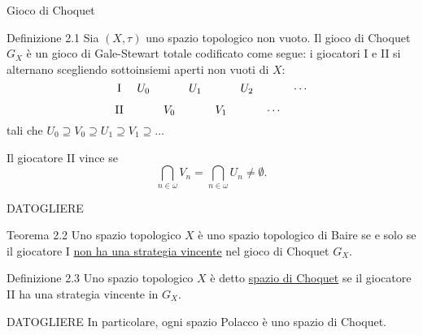 \documentclass[babel]{beamer}
\renewcommand{\href}[2]{#2}
\begin{document}
\begin{frame}[label={sec:org1e115ec}]{Gioco di Choquet}
\begin{block}{Definizione 2.1}
Sia \((X,\tau)\) uno \href{../../../../../../../org/roam/20250103145124-topologia.org}{spazio topologico} non vuoto. Il gioco di Choquet \(G_{X}\) è un \href{../../../../../../../org/roam/20250513155732-logic_game.org}{gioco} \href{../../../../../../../org/roam/20250513171520-giochi_di_gale_stewart.org}{di Gale-Stewart} totale codificato come segue: i giocatori I e II si alternano scegliendo sottoinsiemi aperti non vuoti di \(X\):
\begin{equation*}
\begin{tikzcd}[ampersand replacement=\&,cramped,sep=tiny]
	{\text{I}} \& {U_0} \&\& {U_1} \&\& {U_2} \&\& \cdots \\
	{\text{II}} \&\& {V_0} \&\& {V_1} \&\& \cdots
\end{tikzcd}
\end{equation*}
tali che \(U_{0} \supseteq V_{0}\supseteq U_{1}\supseteq V_{1}\supseteq \dots\)

Il giocatore II vince se
\begin{equation*}
\bigcap_{n \in \omega} V_{n} = \bigcap_{n \in \omega} U_{n} \neq \emptyset.
\end{equation*}
\end{block}
\end{frame}
\begin{frame}[label={sec:org9d69a79}]{DATOGLIERE}
\begin{alertblock}{Teorema 2.2}
Uno \href{../../../../../../../org/roam/20250103145124-topologia.org}{spazio topologico} \(X\) è uno \href{../../../../../../../org/roam/20250514154101-spazio_topologico_di_baire.org}{spazio topologico di Baire} se e solo se il giocatore I \uline{non ha una \href{../../../../../../../org/roam/20250513171520-giochi_di_gale_stewart.org}{strategia} \href{../../../../../../../org/roam/20250513171520-giochi_di_gale_stewart.org}{vincente}} nel \href{../../../../../../../org/roam/20250514174255-gioco_di_choquet.org}{gioco di Choquet} \(G_{X}\).
\end{alertblock}
\begin{block}{Definizione 2.3}
Uno spazio topologico \(X\) è detto \uline{spazio di Choquet} se il giocatore II ha una strategia vincente in \(G_{X}\).
\end{block}
\begin{block}{DATOGLIERE}
In particolare, ogni spazio Polacco è uno spazio di Choquet.
\end{block}
\end{frame}
\end{document}
